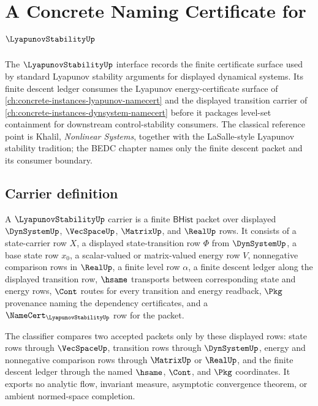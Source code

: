 \chapter{A Concrete Naming Certificate for $\LyapunovStabilityUp$}
\label{ch:concrete-instances-lyapunovstability-namecert}

The $\LyapunovStabilityUp$ interface records the finite certificate surface used by standard Lyapunov stability arguments for displayed dynamical systems. Its finite descent ledger consumes the Lyapunov energy-certificate surface of \autoref{ch:concrete-instances-lyapunov-namecert} and the displayed transition carrier of \autoref{ch:concrete-instances-dynsystem-namecert} before it packages level-set containment for downstream control-stability consumers. The classical reference point is Khalil, \emph{Nonlinear Systems}, together with the LaSalle-style Lyapunov stability tradition; the BEDC chapter names only the finite descent packet and its consumer boundary.

\section{Carrier definition}
\label{sec:lyapunovstability-carrier}

\begin{definition}
\label{def:lyapunovstability-bhist-carrier}
A $\LyapunovStabilityUp$ carrier is a finite $\mathsf{BHist}$ packet over displayed $\DynSystemUp$, $\VecSpaceUp$, $\MatrixUp$, and $\RealUp$ rows. It consists of a state-carrier row $X$, a displayed state-transition row $\Phi$ from $\DynSystemUp$, a base state row $x_0$, a scalar-valued or matrix-valued energy row $V$, nonnegative comparison rows in $\RealUp$, a finite level row $\alpha$, a finite descent ledger along the displayed transition row, $\hsame$ transports between corresponding state and energy rows, $\Cont$ routes for every transition and energy readback, $\Pkg$ provenance naming the dependency certificates, and a $\NameCert_{\LyapunovStabilityUp}$ row for the packet.

The classifier compares two accepted packets only by these displayed rows: state rows through $\VecSpaceUp$, transition rows through $\DynSystemUp$, energy and nonnegative comparison rows through $\MatrixUp$ or $\RealUp$, and the finite descent ledger through the named $\hsame$, $\Cont$, and $\Pkg$ coordinates. It exports no analytic flow, invariant measure, asymptotic convergence theorem, or ambient normed-space completion.
\end{definition}

